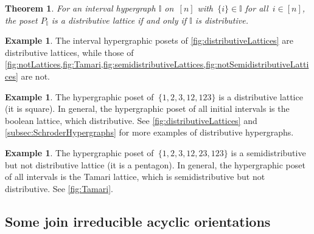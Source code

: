 \documentclass[reqno]{amsart}
\newtheorem{theoremA}{Theorem}
\theoremstyle{definition}
\newtheorem{example}[theorem]{Example}
\newcommand{\II}{\mathbb I} %
\begin{document}
\begin{theoremA}
For an interval hypergraph $\II$ on~$[n]$ with~$\{i\} \in \II$ for all~$i \in [n]$, the poset $P_\II$ is a distributive lattice if and only if $\II$ is distributive.
\end{theoremA}

\begin{example}
The interval hypergraphic posets of \cref{fig:distributiveLattices} are distributive lattices, while those of \cref{fig:notLattices,fig:Tamari,fig:semidistributiveLattices,fig:notSemidistributiveLattices} are not.
\end{example}

\begin{example}
The hypergraphic poset of~$\{ 1, 2, 3, 12, 123\}$ is a distributive lattice (it is square).
In general, the hypergraphic poset of all initial intervals is the boolean lattice, which distributive.
See \cref{fig:distributiveLattices} and \cref{subsec:SchroderHypergraphs} for more examples of distributive hypergraphs.
\end{example}

\begin{example}
The hypergraphic poset of~$\{ 1, 2, 3, 12, 23, 123 \}$ is a semidistributive but not distributive lattice (it is a pentagon).
In general, the hypergraphic poset of all intervals is the Tamari lattice, which is semidistributive but not distributive.
See \cref{fig:Tamari}.
\end{example}


\subsection{Some join irreducible acyclic orientations}  
\label{subsec:someJoinIrreducibles}
\end{document}

